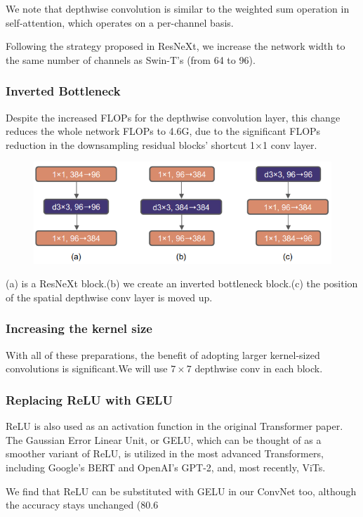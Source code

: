 \documentclass[11pt]{article}
\begin{document}
We note that depthwise convolution is similar to the weighted sum operation in self-attention, which operates on a per-channel basis.

Following the strategy proposed in ResNeXt, we increase the network width to the same number of channels as Swin-T’s (from 64 to 96).

\subsubsection{Inverted Bottleneck}
Despite the increased FLOPs for the depthwise convolution layer, this change reduces the whole network FLOPs to 4.6G, due to the significant FLOPs reduction in the downsampling residual blocks’ shortcut 1×1 conv layer.
\begin{figure}[H]
	\centering
	\includegraphics[scale=0.5]{44}
\end{figure}
(a) is a ResNeXt block.(b) we create an inverted bottleneck block.(c) the position of the spatial depthwise conv layer is moved up.

\subsubsection{Increasing the kernel size}
With all of these preparations, the benefit of adopting larger kernel-sized convolutions is significant.We will use $7\times 7$ depthwise conv in each block.

\subsubsection{Replacing ReLU with GELU}
ReLU is also used as an activation function in the original Transformer paper. The Gaussian Error Linear Unit, or GELU, which can be thought of as a smoother variant of ReLU, is utilized in the most advanced Transformers, including Google’s BERT and OpenAI’s GPT-2, and, most recently, ViTs.

We find that ReLU can be substituted with GELU in our ConvNet too, although the accuracy stays unchanged (80.6%
\end{document}
